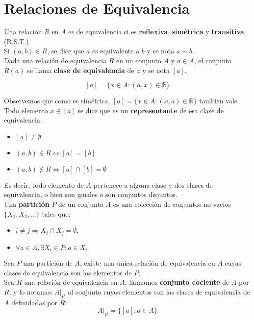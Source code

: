 \documentclass[11pt,a4paper]{article}
\begin{document}
\newpage
\section{Relaciones de Equivalencia}
\noindent Una relaci\'on $R$ en $A$ es de equivalencia si es \textbf{reflexiva}, \textbf{sim\'etrica} y \textbf{transitiva} (R.S.T.)\\

\noindent Si $(a,b) \in R$, se dice que $a$ es equivalente a $b$ y se nota $a \sim b$.\\

\noindent Dada una relaci\'on de equivalencia $R$ en un conjunto $A$ y $a \in A$, el conjunto $R(a)$ se llama \textbf{clase de equivalencia} de $a$ y se nota $[a]$.

$$[a] = \{ x \in A : (a,x) \in \mathbb{R} \}$$

\noindent Observemos que como es sim\'etrica, $[a] = \{ x \in A : (x,a) \in \mathbb{R} \}$ tambien vale. Todo elemento $x \in [a]$ se dice que es un \textbf{representante} de esa clase de equivalencia.

\begin{itemize}
\item $[a] \not = \emptyset$
\item $(a,b) \in R \iff [a]=[b]$
\item $(a,b) \not \in R \iff [a]\cap[b] = \emptyset$
\end{itemize}

\noindent Es decir, todo elemento de $A$ pertenece a alguna clase y dos clases de equivalencia, o bien son iguales o son conjuntos disjuntos.\\

\noindent Una \textbf{partici\'on} $P$ de un conjunto $A$ es una colecci\'on de conjuntos no vacios $\{ X_1, X_2, ...\}$ tales que:
\begin{itemize}
\item $i \not = j \Rightarrow X_i \cap X_j = \emptyset$,
\item $\forall a \in A, \exists X_i \in P : a \in X_i$
\end{itemize}

\noindent Sea $P$ una partici\'on de $A$, existe una \'unica relaci\'on de equivalencia en $A$ cuyas clases de equivalencia son los elementos de $P$.\\

\noindent Sea $R$ una relaci\'on de equivalencia en $A$, llamamos \textbf{conjunto cociente} de $A$ por $R$, y lo notamos $A|_R$ al conjunto cuyos elementos son las clases de equivalencia de $A$ definidadas por $R$: $$A|_R = \{ [a] : a \in A \}$$
\end{document}
